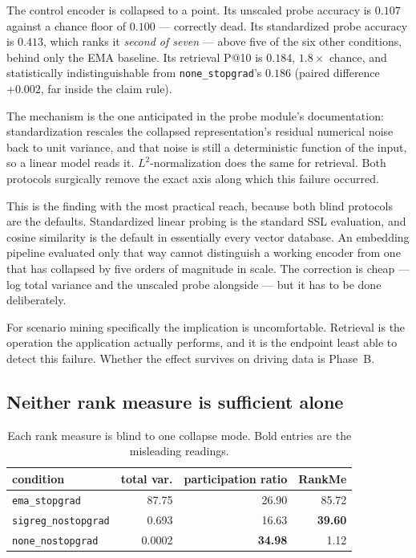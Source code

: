 \ours{} The control encoder is collapsed to a point. Its unscaled probe accuracy is
$0.107$ against a chance floor of $0.100$ --- correctly dead. Its standardized probe
accuracy is $0.413$, which ranks it \emph{second of seven} --- above five of the six
other conditions, behind only the EMA baseline. Its retrieval P@10 is $0.184$,
$1.8\times$ chance, and
statistically indistinguishable from \texttt{none\_stopgrad}'s $0.186$ (paired difference
$+0.002$, far inside the claim rule).

\interp{} The mechanism is the one anticipated in the probe module's documentation:
standardization rescales the collapsed representation's residual numerical noise back to
unit variance, and that noise is still a deterministic function of the input, so a linear
model reads it. $L^2$-normalization does the same for retrieval. Both protocols surgically
remove the exact axis along which this failure occurred.

\interp{} This is the finding with the most practical reach, because both blind protocols
are the defaults. Standardized linear probing is the standard SSL evaluation, and cosine
similarity is the default in essentially every vector database. An embedding pipeline
evaluated only that way cannot distinguish a working encoder from one that has collapsed by
five orders of magnitude in scale. The correction is cheap --- log total variance and the
unscaled probe alongside --- but it has to be done deliberately.

\ours{} For scenario mining specifically the implication is uncomfortable. Retrieval is the
operation the application actually performs, and it is the endpoint least able to detect
this failure. Whether the effect survives on driving data is Phase~B.

\subsection{Neither rank measure is sufficient alone}

\begin{table}[h]
\centering
\small
\begin{tabular}{l r r r}
\toprule
\textbf{condition} & \textbf{total var.} & \textbf{participation ratio} & \textbf{RankMe} \\
\midrule
\texttt{ema\_stopgrad}      & 87.75  & 26.90 & 85.72 \\
\texttt{sigreg\_nostopgrad} & 0.693  & 16.63 & \textbf{39.60} \\
\texttt{none\_nostopgrad}   & 0.0002 & \textbf{34.98} & 1.12 \\
\bottomrule
\end{tabular}
\caption{\ours{} Each rank measure is blind to one collapse mode. Bold entries are the
misleading readings.}
\label{tab:rank}
\end{table}

